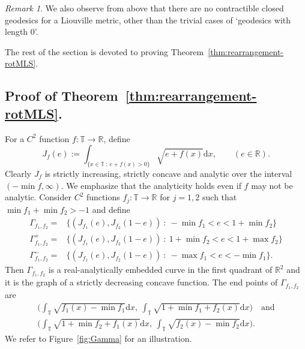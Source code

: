\documentclass[11pt,letterpaper,oneside]{amsart}
\newcommand{\R}{\mathbb{R}}
\newcommand{\T}{\mathbb{T}}
\theoremstyle{definition}
\theoremstyle{remark}
\theoremstyle{definition}
\theoremstyle{remark}
\newtheorem*{remark}{Remark}
\newcommand{\dif}{\mathrm{d}}
\begin{document}
\begin{remark}
    We also observe from above that there are no contractible closed geodesics for a Liouville metric, other than the trivial cases of `geodesics with length $0$'.
\end{remark}

The rest of the section is devoted to proving
Theorem~\ref{thm:rearrangement-rotMLS}.

\subsection{Proof of Theorem~\ref{thm:rearrangement-rotMLS}.}

For a $C^2$ function $f: \T \to \R$, define 
\begin{equation}\label{eq:J def}
    J_f(e) := \int_{\{x \in \T \ : \ e + f(x) > 0\}} \sqrt{e + f(x)} \dif x, \qquad (e \in \R).
\end{equation}
Clearly $J_f$ is strictly increasing, strictly concave and analytic over the interval $(-\min f, \infty)$. 
We emphasize that the analyticity holds even if $f$ may not be analytic.
Consider $C^2$ functions $f_j: \T \to \R$ for $j = 1,2$ such that $\min f_1 + \min f_2 > -1$ and define 
\begin{equation}\label{eq:Gam def}
\begin{aligned}
    \Gamma_{f_1, f_2} =& \{(J_{f_1}(e), J_{f_2}(1 - e)) \ : \  -\min f_1 < e < 1 + \min f_2\}\\
    \Gamma^+_{f_1, f_2} =& \{(J_{f_1}(e), J_{f_2}(1 - e)) \ : \  1 + \min f_2 < e < 1 + \max f_2\}\\
    \Gamma^-_{f_1, f_2} =& \{(J_{f_1}(e), J_{f_2}(1 - e)) \ : \  -\max f_1 < e < - \min f_1\}.
\end{aligned}
\end{equation}
Then $\Gamma_{f_1, f_2}$ is a real-analytically embedded curve in the first quadrant of $\R^2$ and it is the graph of a strictly decreasing concave function. 
The end points of $\Gamma_{f_1, f_2}$ are 
\begin{equation}\label{eq:Gam ends}
\begin{gathered}
    \Big(\int_\T \sqrt{f_1(x) - \min f_1} \dif x,\ \int_\T \sqrt{1 + \min f_1 + f_2(x)} \dif x\Big) \quad \text{and}\\
    \Big(\int_\T \sqrt{1 + \min f_2 + f_1(x)} \dif x,\ \int_\T \sqrt{f_2(x) - \min f_2} \dif x \Big).
\end{gathered}
\end{equation}
We refer to Figure~\ref{fig:Gamma} for an illustration.
\end{document}
